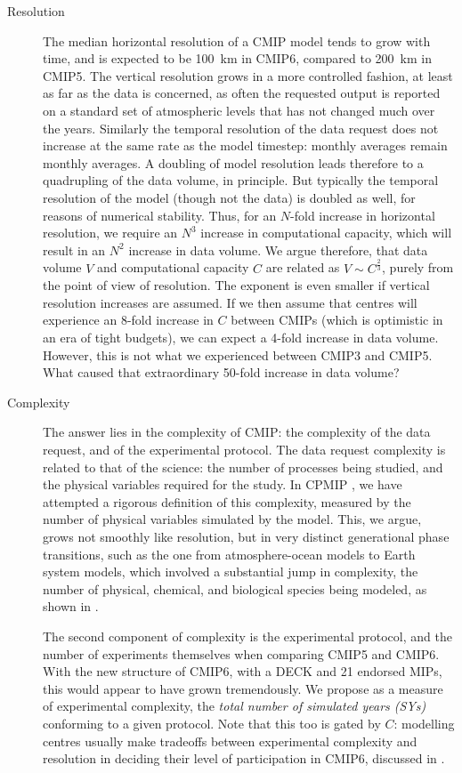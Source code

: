 \documentclass[gmd,manuscript]{copernicus}
\newcommand{\bibref}[1] { \cite{ref:#1}}
\newcommand{\pipref}[1] {\citep{ref:#1}}
\begin{document}
\begin{description}
\item[Resolution] The median horizontal resolution of a CMIP model
  tends to grow with time, and is expected to be 100~km in CMIP6,
  compared to 200~km in CMIP5. The vertical resolution grows in a more
  controlled fashion, at least as far as the data is concerned, as
  often the requested output is reported on a standard set of
  atmospheric levels that has not changed much over the years.
  Similarly the temporal resolution of the data request does not
  increase at the same rate as the model timestep: monthly averages
  remain monthly averages. A doubling of model resolution leads
  therefore to a quadrupling of the data volume, in principle. But
  typically the temporal resolution of the model (though not the data)
  is doubled as well, for reasons of numerical stability. Thus, for an
  $N$-fold increase in horizontal resolution, we require an $N^3$
  increase in computational capacity, which will result in an $N^2$
  increase in data volume. We argue therefore, that data volume $V$
  and computational capacity $C$ are related as $V \sim C^\frac23$,
  purely from the point of view of resolution. The exponent is even
  smaller if vertical resolution increases are assumed. If we then
  assume that centres will experience an 8-fold increase in $C$
  between CMIPs (which is optimistic in an era of tight budgets), we
  can expect a 4-fold increase in data volume. However, this is not
  what we experienced between CMIP3 and CMIP5. What caused that
  extraordinary 50-fold increase in data volume?
\item[Complexity] The answer lies in the complexity of CMIP: the
  complexity of the data request, and of the experimental protocol.
  The data request complexity is related to that of the science: the
  number of processes being studied, and the physical variables
  required for the study. In CPMIP \pipref{balajietal2017}, we have
  attempted a rigorous definition of this complexity, measured
  by the number of physical variables simulated by the model. This, we
  argue, grows not smoothly like resolution, but in very distinct
  generational phase transitions, such as the one from
  atmosphere-ocean models to Earth system models, which involved a
  substantial jump in complexity, the number of physical, chemical,
  and biological species being modeled, as shown in
  \bibref{balajietal2017}.

  The second component of complexity is the experimental protocol, and 
  the number of experiments themselves when comparing CMIP5 and CMIP6.
  With the new structure of CMIP6, with a DECK and 21 endorsed MIPs,
  this would appear to have grown tremendously. We propose as a
  measure of experimental complexity, the \emph{total number of 
  simulated years (SYs)} conforming to a given protocol. Note that
  this too is gated by $C$: modelling centres usually make tradeoffs
  between experimental complexity and resolution in deciding their
  level of participation in CMIP6, discussed in 
  \bibref{balajietal2017}.
\end{description}
\end{document}
